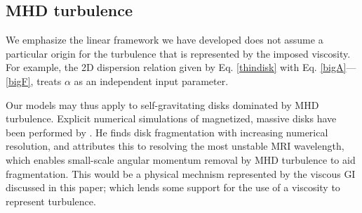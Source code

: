 \subsection{MHD turbulence}\label{MHD}%
We emphasize the linear framework we have developed does not assume  
a particular origin for the turbulence that is represented by the imposed
viscosity. For example, the 2D dispersion relation given by Eq. \ref{thindisk}
with Eq. \ref{bigA}---\ref{bigF}, treats $\alpha$ as an independent
input parameter. 


Our models may thus apply to self-gravitating disks dominated by MHD
turbulence.     
Explicit numerical simulations of magnetized, massive disks have been performed 
by \cite{fromang05}. He finds disk fragmentation with increasing numerical
resolution, and attributes this to resolving the most unstable MRI
wavelength, which enables small-scale angular momentum removal by MHD
turbulence to aid fragmentation. %
This would be a physical mechnism represented by the viscous GI 
discussed in this paper; which lends some support for  
the use of a viscosity to represent turbulence.    


